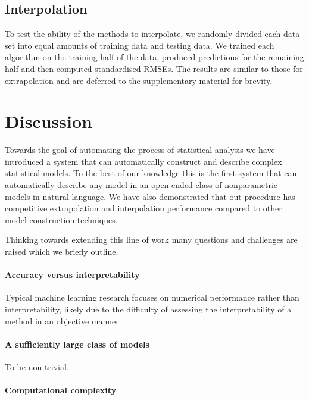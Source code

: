 \documentclass[letterpaper]{article}
\begin{document}
\subsection{Interpolation}

To test the ability of the methods to interpolate, we randomly divided each data set into equal amounts of training data and testing data.
We trained each algorithm on the training half of the data, produced predictions for the remaining half and then computed standardised RMSEs.
The results are similar to those for extrapolation and are deferred to the supplementary material for brevity.

\section{Discussion}

Towards the goal of automating the process of statistical analysis we have introduced a system that can automatically construct and describe complex statistical models.
To the best of our knowledge this is the first system that can automatically describe any model in an open-ended class of nonparametric models in natural language.
We have also demonstrated that out procedure has competitive extrapolation and interpolation performance compared to other model construction techniques.

Thinking towards extending this line of work many questions and challenges are raised which we briefly outline.

\paragraph{Accuracy versus interpretability}

Typical machine learning research focuses on numerical performance rather than interpretability, likely due to the difficulty of assessing the interpretability of a method in an objective manner.

\paragraph{A sufficiently large class of models}

To be non-trivial.

\paragraph{Computational complexity}
\end{document}
